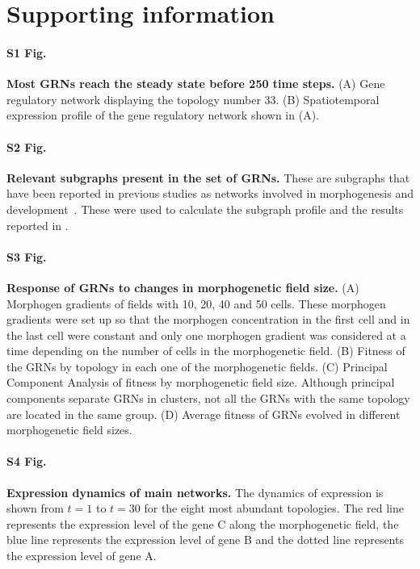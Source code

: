 \documentclass[10pt,letterpaper]{article}
\begin{document}
\section*{Supporting information}


\paragraph*{S1 Fig.}
\label{S1_Fig}
{\bf Most GRNs reach the steady state before 250 time steps.}
(A) Gene regulatory network displaying the topology number 33. (B) Spatiotemporal
expression profile of the gene regulatory network shown in (A).

\paragraph*{S2 Fig.}
\label{S2_Fig}
{\bf Relevant subgraphs present in the set of GRNs.}
These are subgraphs that have been reported in previous studies as networks
involved in morphogenesis and development~\cite{Cotterell2010, Schaerli2014,
Schaerli2018}. These were used to calculate the subgraph profile and the results
reported in .

\paragraph*{S3 Fig.}
\label{S3_Fig}
{\bf Response of GRNs to changes in morphogenetic field size.}
(A) Morphogen gradients of fields with 10, 20, 40 and 50 cells. These
morphogen gradients were set up so that the morphogen concentration in the
first cell and in the last cell were constant and only one
morphogen gradient was considered at a time depending on the number of
cells in the morphogenetic field. (B) Fitness of the
GRNs by topology in each one of the morphogenetic fields. (C) Principal Component
Analysis of fitness by morphogenetic field size. Although principal components
separate GRNs in clusters, not all the GRNs with the same topology are located in the
same group. (D) Average fitness of GRNs evolved in different morphogenetic
field sizes.

\paragraph*{S4 Fig.}
\label{S4_Fig}
{\bf Expression dynamics of main networks.}
The dynamics of expression is shown from $t = 1$ to $t = 30$ for the eight most
abundant topologies. The red line
represents the expression level of the gene C along the morphogenetic field,
the blue line represents the expression level of gene B and
the dotted line represents the expression level of gene A.
\end{document}
